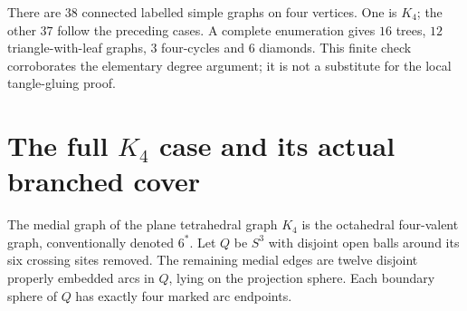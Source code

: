 \documentclass[11pt]{article}
\begin{document}
There are $38$ connected labelled simple graphs on four vertices.
One is $K_4$; the other $37$ follow the preceding cases.
A complete enumeration gives $16$ trees, $12$ triangle-with-leaf
graphs, $3$ four-cycles and $6$ diamonds.
This finite check corroborates the elementary degree argument;
it is not a substitute for the local tangle-gluing proof.

\section{The full \texorpdfstring{$K_4$}{K4} case and its actual branched cover}

The medial graph of the plane tetrahedral graph $K_4$ is the
octahedral four-valent graph, conventionally denoted $6^*$.
Let $Q$ be $S^3$ with disjoint open balls around its six crossing
sites removed. The remaining medial edges are twelve disjoint properly
embedded arcs in $Q$, lying on the projection sphere.
Each boundary sphere of $Q$ has exactly four marked arc endpoints.
\end{document}
